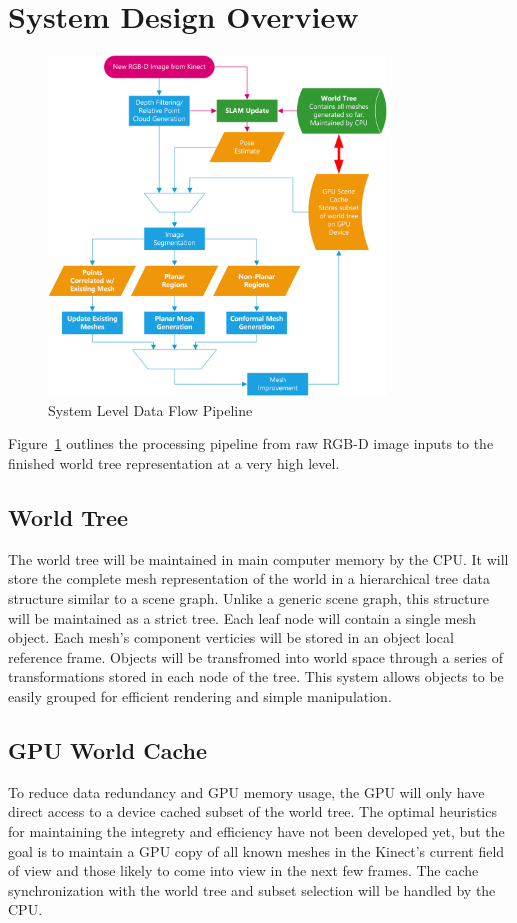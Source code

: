 \documentclass[english]{article}
\begin{document}
\section{System Design Overview}
\begin{figure}[systemdiagram]
    \centering
    \includegraphics[width=0.8\textwidth]{Diagrams/TopLevelPipeline.png}
    \caption{System Level Data Flow Pipeline}
    \label{fig:systemdiagram}
\end{figure}

Figure~\ref{fig:systemdiagram} outlines the processing pipeline from raw RGB-D image inputs to the finished world tree representation at a very high level. 

\subsection{World Tree}
The world tree will be maintained in main computer memory by the CPU. It will store the complete mesh representation of the world in a hierarchical tree data structure similar to a scene graph. Unlike a generic scene graph, this structure will be maintained as a strict tree. Each leaf node will contain a single mesh object. Each mesh's component verticies will be stored in an object local reference frame. Objects will be transfromed into world space through a series of transformations stored in each node of the tree. This system allows objects to be easily grouped for efficient rendering and simple manipulation.

\subsection{GPU World Cache}
To reduce data redundancy and GPU memory usage, the GPU will only have direct access to a device cached subset of the world tree. The optimal heuristics for maintaining the integrety and efficiency have not been developed yet, but the goal is to maintain a GPU copy of all known meshes in the Kinect's current field of view and those likely to come into view in the next few frames. The cache synchronization with the world tree and subset selection will be handled by the CPU.
\end{document}
